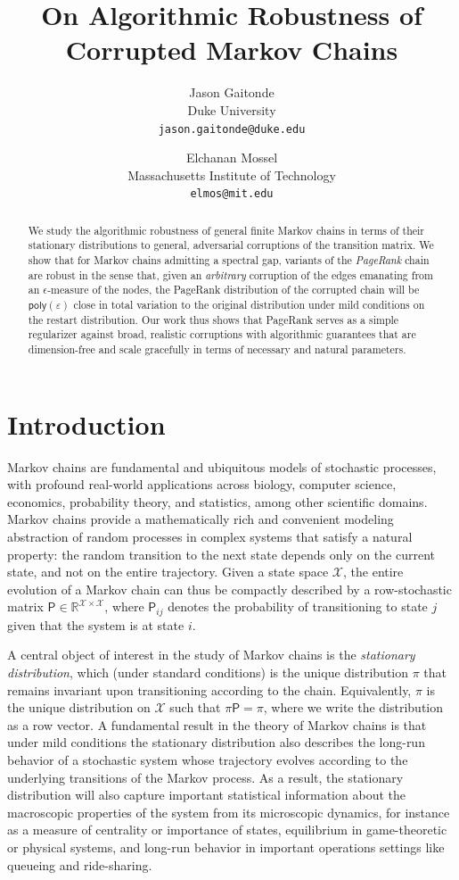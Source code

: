 \documentclass[11pt]{article}
\title{On Algorithmic Robustness of Corrupted Markov Chains
}
\author{Jason Gaitonde\\
Duke University\\
\texttt{jason.gaitonde@duke.edu}
\and Elchanan Mossel\\
Massachusetts Institute of Technology\\
\texttt{elmos@mit.edu}}
\date{}
\theoremstyle{remark}
\begin{document}
\maketitle
\begin{abstract}
We study the algorithmic robustness of  
general finite Markov chains in terms of their stationary distributions to general, adversarial corruptions of the transition matrix.  
We show that for Markov chains admitting a spectral gap, variants of the \emph{PageRank}
chain are robust in the sense that, given an \emph{arbitrary} corruption of the edges emanating from an $\epsilon$-measure of the nodes, the PageRank distribution of the corrupted chain will be $\mathsf{poly}(\varepsilon)$ close in total variation to the 
original distribution under mild conditions on the restart distribution. 
Our work thus shows that PageRank serves as a simple regularizer against broad, realistic corruptions with algorithmic guarantees that are dimension-free and scale gracefully in terms of necessary and natural parameters. 
\end{abstract}
\newpage

\section{Introduction}

Markov chains are fundamental and ubiquitous models of stochastic processes, with profound real-world applications across biology, computer science, economics, probability theory, and statistics, among other scientific domains. 
Markov chains provide a mathematically rich and convenient modeling abstraction of random processes in complex systems that satisfy a natural 
property: the random transition to the next state depends only on the current state, and not on the entire trajectory. Given a state space $\mathcal{X}$, the entire evolution of a Markov chain can thus be compactly described by a row-stochastic matrix $\mathsf{P}\in \mathbb{R}^{\mathcal{X}\times \mathcal{X}}$, where $\mathsf{P}_{ij}$ denotes the probability of transitioning to state $j$ given that the system is at state $i$.

A central object of interest in the study of Markov chains is the \emph{stationary distribution}, which (under standard conditions) is the unique distribution $\pi$ that remains invariant upon transitioning according to the chain. Equivalently, $\pi$ is the unique distribution on $\mathcal{X}$ such that $\pi \mathsf{P}=\pi$, where we write the distribution as a row vector. A fundamental result in the theory of Markov chains is that under mild conditions the stationary distribution also describes the long-run behavior of a stochastic system whose trajectory evolves according to the underlying transitions of the Markov process. As a result, the stationary distribution will also capture important statistical information about the macroscopic properties of the system from its microscopic dynamics, for instance as a measure of centrality or importance of states, equilibrium in game-theoretic or physical systems, and long-run behavior in important operations settings like queueing and ride-sharing.
\end{document}
